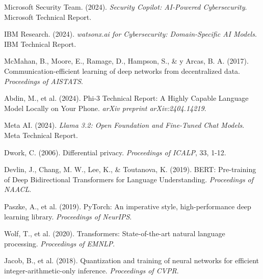 \documentclass[11pt,a4paper]{article}
\begin{document}
\begin{thebibliography}{99}

Microsoft Security Team. (2024). \textit{Security Copilot: AI-Powered Cybersecurity}. Microsoft Technical Report.

IBM Research. (2024). \textit{watsonx.ai for Cybersecurity: Domain-Specific AI Models}. IBM Technical Report.

McMahan, B., Moore, E., Ramage, D., Hampson, S., \& y Arcas, B. A. (2017). Communication-efficient learning of deep networks from decentralized data. \textit{Proceedings of AISTATS}.

Abdin, M., et al. (2024). Phi-3 Technical Report: A Highly Capable Language Model Locally on Your Phone. \textit{arXiv preprint arXiv:2404.14219}.

Meta AI. (2024). \textit{Llama 3.2: Open Foundation and Fine-Tuned Chat Models}. Meta Technical Report.

Dwork, C. (2006). Differential privacy. \textit{Proceedings of ICALP}, 33, 1-12.

Devlin, J., Chang, M. W., Lee, K., \& Toutanova, K. (2019). BERT: Pre-training of Deep Bidirectional Transformers for Language Understanding. \textit{Proceedings of NAACL}.

Paszke, A., et al. (2019). PyTorch: An imperative style, high-performance deep learning library. \textit{Proceedings of NeurIPS}.

Wolf, T., et al. (2020). Transformers: State-of-the-art natural language processing. \textit{Proceedings of EMNLP}.

Jacob, B., et al. (2018). Quantization and training of neural networks for efficient integer-arithmetic-only inference. \textit{Proceedings of CVPR}.

\end{thebibliography}
\end{document}
